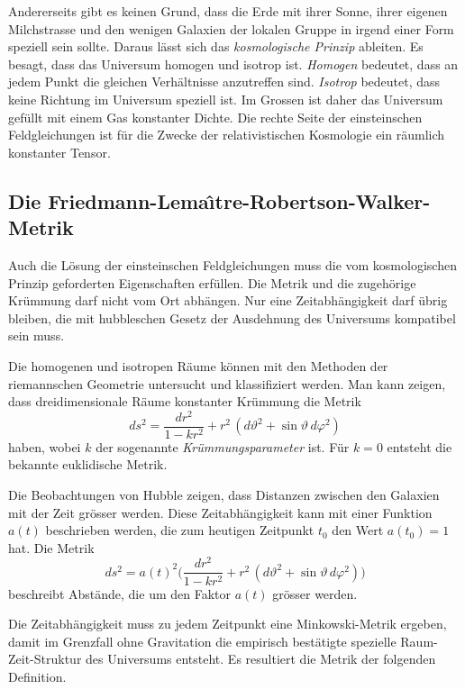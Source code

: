 Andererseits gibt es keinen Grund, dass die Erde mit ihrer Sonne, ihrer
eigenen Milchstrasse und den wenigen Galaxien der lokalen Gruppe in
irgend einer Form speziell sein sollte.
Daraus lässt sich das \emph{kosmologische Prinzip} ableiten.
%
Es besagt, dass das Universum homogen und isotrop ist.
\emph{Homogen} bedeutet, dass an jedem Punkt die gleichen Verhältnisse
anzutreffen sind.
%
\emph{Isotrop} bedeutet, dass keine Richtung im Universum speziell ist.
Im Grossen ist daher das Universum gefüllt mit einem Gas konstanter
Dichte.
%
Die rechte Seite der einsteinschen Feldgleichungen ist für die 
Zwecke der relativistischen Kosmologie ein räumlich konstanter Tensor.

%
%
\subsection{Die Friedmann-Lema\^\i tre-Robertson-Walker-Metrik}
Auch die Lösung der einsteinschen Feldgleichungen muss die vom
kosmologischen Prinzip geforderten Eigenschaften erfüllen.
Die Metrik und die zugehörige Krümmung darf nicht vom Ort
abhängen.
Nur eine Zeitabhängigkeit darf übrig bleiben, die mit hubbleschen
Gesetz der Ausdehnung des Universums kompatibel sein muss.

Die homogenen und isotropen Räume können mit den Methoden der
riemannschen Geometrie untersucht und klassifiziert werden.
Man kann zeigen, dass dreidimensionale Räume konstanter Krümmung 
die Metrik
\[
ds^2
=
\frac{dr^2}{1-kr^2} + r^2\,(d\vartheta^2 + \sin\vartheta\,d\varphi^2)
\]
haben, wobei $k$ der sogenannte \emph{Krümmungsparameter} ist.
Für $k=0$ entsteht die bekannte euklidische Metrik.

Die Beobachtungen von Hubble zeigen, dass Distanzen zwischen
den Galaxien mit der Zeit grösser werden.
Diese Zeitabhängigkeit kann mit einer Funktion $a(t)$ beschrieben
werden, die zum heutigen Zeitpunkt $t_0$ den Wert $a(t_0)=1$ hat.
Die Metrik
\begin{equation}
ds^2
=
a(t)^2
\biggl(
\frac{dr^2}{1-kr^2} + r^2\,(d\vartheta^2 + \sin\vartheta\,d\varphi^2)
\biggr)
\label{buch:kruemmung:kosmologie:eqn:ads}
\end{equation}
beschreibt Abstände, die um den Faktor $a(t)$ grösser werden.

Die Zeitabhängigkeit muss zu jedem Zeitpunkt eine Minkowski-Metrik
ergeben, damit im Grenzfall ohne Gravitation die empirisch bestätigte
spezielle Raum-Zeit-Struktur des Universums entsteht.
Es resultiert die Metrik der folgenden Definition.

